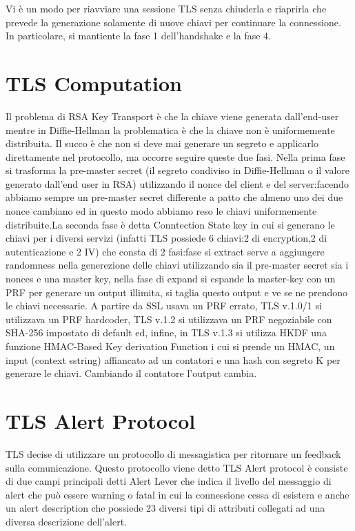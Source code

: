 \documentclass[a4paper,draft]{article}
\begin{document}
Vi è un modo per riavviare una sessione TLS senza chiuderla e riaprirla che prevede la generazione solamente di nuove chiavi per continuare la connessione\@. In particolare, si mantiente la fase 1 dell'handshake e la fase 4\@.

\section{TLS Computation}
Il problema di RSA Key Transport è che la chiave viene generata dall'end-user mentre in Diffie-Hellman la problematica è che la chiave non è uniformemente distribuita\@. Il succo è che non si deve mai generare un segreto e applicarlo direttamente nel protocollo, ma occorre seguire queste due fasi\@.\newline
Nella prima fase si trasforma la pre-master secret (il segreto condiviso in Diffie-Hellman o il valore generato dall'end user in RSA) utilizzando il nonce del client e del server: facendo abbiamo sempre un pre-master secret differente a patto che almeno uno dei due nonce cambiano ed in questo modo abbiamo reso le chiavi uniformemente distribuite\@.\newline La seconda fase è detta Conntection State key in cui si generano le chiavi per i diversi servizi (infatti TLS possiede 6 chiavi:\@2 di encryption,2 di autenticazione e 2 IV) che consta di 2 fasi:\@la fase si extract serve a aggiungere randomness nella generezione delle chiavi utilizzando sia il pre-master secret sia i nonces e una master key, nella fase di expand si espande la master-key con un PRF per generare un output illimita, si taglia questo output e ve se ne prendono le chiavi necessarie\@.\newline
A partire da SSL usava un PRF errato, TLS v.1.0/1 si utilizzava un PRF hardcoder, TLS v.1.2 si utilizzava un PRF negoziabile con SHA-256 impostato di default ed, infine, in TLS v.1.3 si utilizza HKDF una funzione HMAC-Based Key derivation Function i cui si prende un HMAC, un input (context sstring) affiancato ad un contatori e una hash con segreto K per generare le chiavi\@. Cambiando il contatore l'output cambia\@.
\section{TLS Alert Protocol}
TLS decise di utilizzare un protocollo di messagistica per ritornare un feedback sulla comunicazione\@. Questo protocollo viene detto TLS Alert protocol è consiste di due campi principali detti Alert Lever che indica il livello del messaggio di alert che può essere warning o fatal in cui la connessione cessa di esistera e anche un alert description che possiede 23 diversi tipi di attributi collegati ad una diversa descrizione dell'alert\@.
\end{document}
